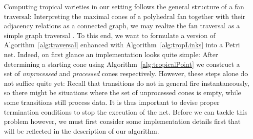 \documentclass[
  paper=a4,
  titlepage,
  bibliography=totoc,
  pagesize=pdftex
]{scrartcl}
\numberwithin{figure}{section}
\numberwithin{equation}{section}
\numberwithin{table}{section}
\theoremstyle{definition}
\numberwithin{definition}{section}
\begin{document}
Computing tropical varieties in our setting follows the general structure of a fan
traversal: Interpreting the maximal cones of a polyhedral fan together with their
adjacency relations as a connected graph, we may realize the fan traversal as a simple
graph traversal \cite{JenTravSym}. To this end, we want to formulate a version of
Algorithm~\ref{alg:traversal} enhanced with Algorithm~\ref{alg:tropLinks} into a Petri
net. Indeed, on first glance an implementation looks quite simple: After determining a
starting cone using Algorithm~\ref{alg:tropicalPoint} we construct a set of
\emph{unprocessed} and \emph{processed} cones respectively. However, these steps alone do
not suffice quite yet: Recall that transitions do not in general fire instantaneously, so
there might be situations where the set of unprocessed cones is empty, while some
transitions still process data. It is thus important to devise proper termination
conditions to stop the execution of the net. Before we can tackle this problem however, we
must first consider some implementation details first that will be reflected in the
description of our algorithm.
\end{document}
